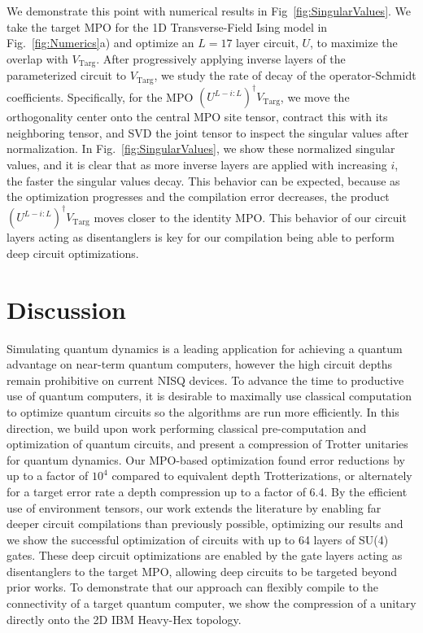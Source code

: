 \documentclass[a4paper,twocolumn,11pt,accepted=2025-06-10]{quantumarticle}
\begin{document}
We demonstrate this point with numerical results in Fig~\ref{fig:SingularValues}. We take the target MPO for the 1D Transverse-Field Ising model in Fig.~\ref{fig:Numerics}a) and optimize an $L=17$ layer circuit, $U$, to maximize the overlap with $V_\text{Targ}$.
After progressively applying inverse layers of the parameterized circuit to $V_\text{Targ}$, we study the rate of decay of the operator-Schmidt coefficients. Specifically, for the MPO $(U^{L-i:L})^{\dagger}V_{\text{Targ}}$, we move the orthogonality center onto the central MPO site tensor, contract this with its neighboring tensor, and SVD the joint tensor to inspect the singular values after normalization.
In Fig.~\ref{fig:SingularValues}, we show these normalized singular values, and it is clear that as more inverse layers are applied with increasing $i$, the faster the singular values decay. This behavior can be expected, because as the optimization progresses and the compilation error decreases, the product $(U^{L-i:L})^{\dagger}V_{\text{Targ}}$ moves closer to the identity MPO. This behavior of our circuit layers acting as disentanglers is key for our compilation being able to perform deep circuit optimizations.


 
\section{Discussion}\label{sec:discussion}

Simulating quantum dynamics is a leading application for achieving a quantum advantage on near-term quantum computers, however the high circuit depths remain prohibitive on current NISQ devices. To advance the time to productive use of quantum computers, it is desirable to maximally use classical computation to optimize quantum circuits so the algorithms are run more efficiently. In this direction, we build upon work performing classical pre-computation and optimization of quantum circuits, and present a compression of Trotter unitaries for quantum dynamics. Our MPO-based optimization found error reductions by up to a factor of $10^4$ compared to equivalent depth Trotterizations, or alternately for a target error rate a depth compression up to a factor of 6.4. By the efficient use of environment tensors, our work extends the literature by enabling far deeper circuit compilations than previously possible, optimizing our results and we show the successful optimization of circuits with up to 64 layers of SU(4) gates. These deep circuit optimizations are enabled by the gate layers acting as disentanglers to the target MPO, allowing deep circuits to be targeted beyond prior works. To demonstrate that our approach can flexibly compile to the connectivity of a target quantum computer, we show the compression of a unitary directly onto the 2D IBM Heavy-Hex topology.
\end{document}
